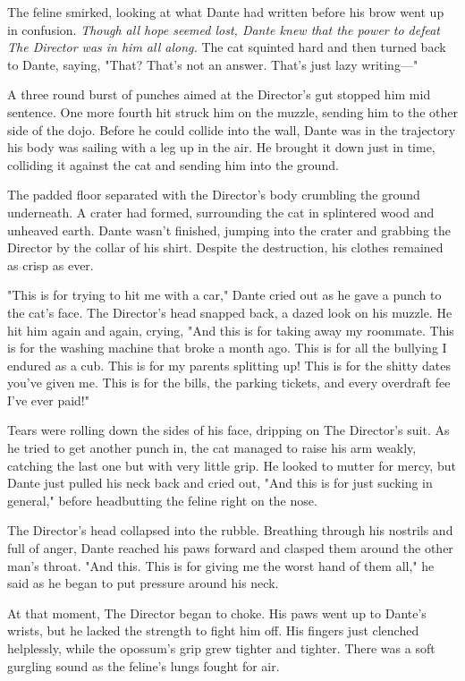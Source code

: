 The feline smirked, looking at what Dante had written before his brow went up in confusion. \emph{Though all hope seemed lost, Dante knew that the power to defeat The Director was in him all along.} The cat squinted hard and then turned back to Dante, saying, "That? That's not an answer. That's just lazy writing---"

A three round burst of punches aimed at the Director's gut stopped him mid sentence. One more fourth hit struck him on the muzzle, sending him to the other side of the dojo. Before he could collide into the wall, Dante was in the trajectory his body was sailing with a leg up in the air. He brought it down just in time, colliding it against the cat and sending him into the ground.

The padded floor separated with the Director's body crumbling the ground underneath. A crater had formed, surrounding the cat in splintered wood and unheaved earth. Dante wasn't finished, jumping into the crater and grabbing the Director by the collar of his shirt. Despite the destruction, his clothes remained as crisp as ever.

"This is for trying to hit me with a car," Dante cried out as he gave a punch to the cat's face. The Director's head snapped back, a dazed look on his muzzle. He hit him again and again, crying, "And this is for taking away my roommate. This is for the washing machine that broke a month ago. This is for all the bullying I endured as a cub. This is for my parents splitting up! This is for the shitty dates you've given me. This is for the bills, the parking tickets, and every overdraft fee I've ever paid!"

Tears were rolling down the sides of his face, dripping on The Director's suit. As he tried to get another punch in, the cat managed to raise his arm weakly, catching the last one but with very little grip. He looked to mutter for mercy, but Dante just pulled his neck back and cried out, "And this is for just sucking in general," before headbutting the feline right on the nose.

The Director's head collapsed into the rubble. Breathing through his nostrils and full of anger, Dante reached his paws forward and clasped them around the other man's throat. "And this. This is for giving me the worst hand of them all," he said as he began to put pressure around his neck.

At that moment, The Director began to choke. His paws went up to Dante's wrists, but he lacked the strength to fight him off. His fingers just clenched helplessly, while the opossum's grip grew tighter and tighter. There was a soft gurgling sound as the feline's lungs fought for air.

